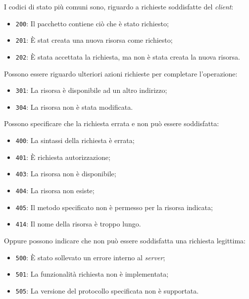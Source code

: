 \documentclass{article}
\numberwithin{equation}{subsection}
\begin{document}
I codici di stato più comuni sono, riguardo a richieste soddisfatte del \textit{client}:
\begin{itemize}
    \item \verb|200|: Il pacchetto contiene ciò che è stato richiesto;
    \item \verb|201|: \`{E} stat creata una nuova risorsa come richiesto;
    \item \verb|202|: \`{E} stata accettata la richiesta, ma non è stata creata la nuova risorsa. 
\end{itemize}
Possono essere riguardo ulteriori azioni richieste per completare l'operazione:
\begin{itemize}
    \item \verb|301|: La risorsa è disponibile ad un altro indirizzo;
    \item \verb|304|: La risorsa non è stata modificata. 
\end{itemize}
Possono specificare che la richiesta errata e non può essere soddisfatta:
\begin{itemize}
    \item \verb|400|: La sintassi della richiesta è errata;
    \item \verb|401|: \`{E} richiesta autorizzazione;
    \item \verb|403|: La risorsa non è disponibile;
    \item \verb|404|: La risorsa non esiste;
    \item \verb|405|: Il metodo specificato non è permesso per la risorsa indicata;
    \item \verb|414|: Il nome della risorsa è troppo lungo. 
\end{itemize}
Oppure possono indicare che non può essere soddisfatta una richiesta legittima:
\begin{itemize}
    \item \verb|500|: \`{E} stato sollevato un errore interno al \textit{server};
    \item \verb|501|: La funzionalità richiesta non è implementata;
    \item \verb|505|: La versione del protocollo specificata non è supportata. 
\end{itemize}
\end{document}
